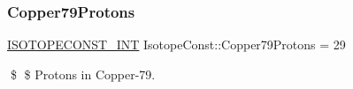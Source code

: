 \subsubsection{\texorpdfstring{Copper79\+Protons}{Copper79Protons}}
{\footnotesize\ttfamily \mbox{\hyperlink{group___isotope_const-_macros_ga5f18360b3e99483a35c32d789e62621c}{I\+S\+O\+T\+O\+P\+E\+C\+O\+N\+S\+T\+\_\+\+I\+NT}} Isotope\+Const\+::\+Copper79\+Protons = 29}

\$ \$ Protons in Copper-\/79. 